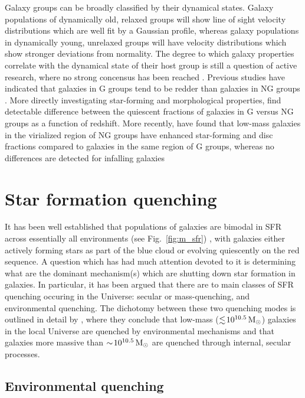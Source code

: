 Galaxy groups can be broadly classified by their dynamical states.
Galaxy populations of dynamically old, relaxed groups will show
line of sight velocity distributions which are well fit by a Gaussian
profile, whereas galaxy populations in dynamically young, unrelaxed
groups will have velocity distributions which show stronger deviations
from normality.  The degree to which galaxy properties correlate with
the dynamical state of their host group is still a question of active
research, where no strong concensus has been reached
\citep[e.g.][]{biviano2002, ribeiro2013b}.  Previous studies have
indicated that galaxies in G groups tend to be redder than galaxies in
NG groups \citep{ribeiro2010, carollo2013, ribeiro2013a}.  More
directly investigating star-forming and morphological properties,
\citet{hou2013} find detectable difference between the quiescent
fractions of galaxies in G versus NG groups as a function of
redshift.  More recently, \citet{roberts2016b} have found that
low-mass galaxies in the virialized region of NG groups have enhanced
star-forming and disc fractions compared to galaxies in the same
region of G groups, whereas no differences are detected for infalling
galaxies 

\section{Star formation quenching}
\label{sec:sfr_quench}

It has been well established that populations of galaxies are bimodal
in SFR across essentially all environments (see Fig.~\ref{fig:m_sfr})
\citep[e.g.][]{wetzel2012}, with galaxies either actively forming
stars as
part of the blue cloud or evolving quiescently on the red sequence.  A
question which has had much attention devoted to it is determining
what are the dominant mechanism(s) which are shutting down star
formation in galaxies.  In particular, it has been argued that there
are to main classes of SFR quenching occuring in the Universe: secular
or mass-quenching, and environmental quenching.  The dichotomy between
these two quenching modes is outlined in detail by \citet{peng2010},
where they conclude that low-mass ($\lesssim \! 10^{10.5}\,\mathrm{M_{\odot}}$)
galaxies in the local Universe are quenched by environmental
mechanisms and that galaxies more massive than $\sim \!
10^{10.5}\,\mathrm{M_{\odot}}$ are quenched through internal, secular processes.  

\subsection{Environmental quenching}
\label{sec:enviro_quench}

